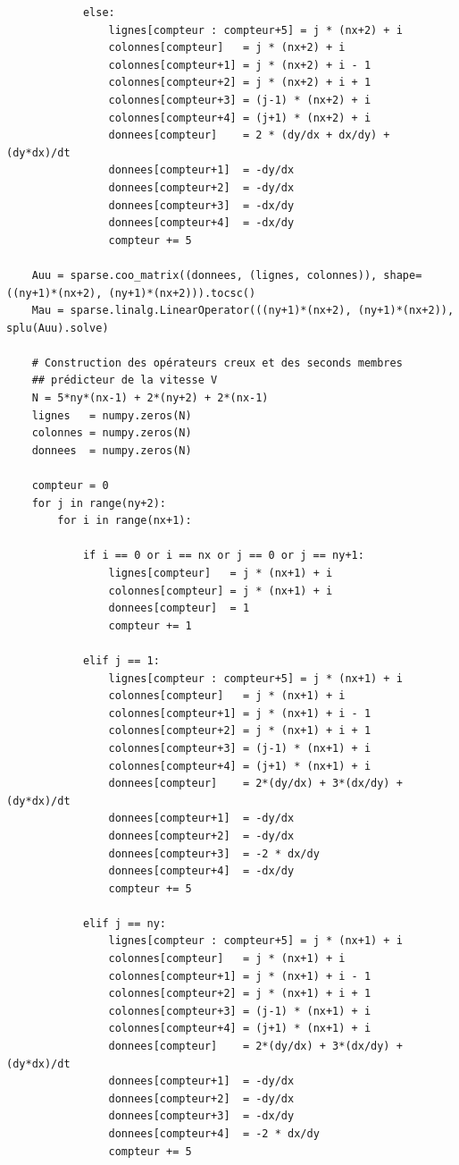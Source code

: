 \begin{verbatim}
            else:
                lignes[compteur : compteur+5] = j * (nx+2) + i
                colonnes[compteur]   = j * (nx+2) + i
                colonnes[compteur+1] = j * (nx+2) + i - 1
                colonnes[compteur+2] = j * (nx+2) + i + 1
                colonnes[compteur+3] = (j-1) * (nx+2) + i
                colonnes[compteur+4] = (j+1) * (nx+2) + i
                donnees[compteur]    = 2 * (dy/dx + dx/dy) + (dy*dx)/dt
                donnees[compteur+1]  = -dy/dx
                donnees[compteur+2]  = -dy/dx
                donnees[compteur+3]  = -dx/dy
                donnees[compteur+4]  = -dx/dy
                compteur += 5

    Auu = sparse.coo_matrix((donnees, (lignes, colonnes)), shape=((ny+1)*(nx+2), (ny+1)*(nx+2))).tocsc()
    Mau = sparse.linalg.LinearOperator(((ny+1)*(nx+2), (ny+1)*(nx+2)), splu(Auu).solve)
    
    # Construction des opérateurs creux et des seconds membres
    ## prédicteur de la vitesse V
    N = 5*ny*(nx-1) + 2*(ny+2) + 2*(nx-1)
    lignes   = numpy.zeros(N)
    colonnes = numpy.zeros(N)
    donnees  = numpy.zeros(N)
    
    compteur = 0
    for j in range(ny+2):
        for i in range(nx+1):
                
            if i == 0 or i == nx or j == 0 or j == ny+1:
                lignes[compteur]   = j * (nx+1) + i
                colonnes[compteur] = j * (nx+1) + i
                donnees[compteur]  = 1
                compteur += 1
   
            elif j == 1:
                lignes[compteur : compteur+5] = j * (nx+1) + i
                colonnes[compteur]   = j * (nx+1) + i
                colonnes[compteur+1] = j * (nx+1) + i - 1
                colonnes[compteur+2] = j * (nx+1) + i + 1
                colonnes[compteur+3] = (j-1) * (nx+1) + i
                colonnes[compteur+4] = (j+1) * (nx+1) + i
                donnees[compteur]    = 2*(dy/dx) + 3*(dx/dy) + (dy*dx)/dt
                donnees[compteur+1]  = -dy/dx
                donnees[compteur+2]  = -dy/dx
                donnees[compteur+3]  = -2 * dx/dy
                donnees[compteur+4]  = -dx/dy
                compteur += 5
            
            elif j == ny:
                lignes[compteur : compteur+5] = j * (nx+1) + i
                colonnes[compteur]   = j * (nx+1) + i
                colonnes[compteur+1] = j * (nx+1) + i - 1
                colonnes[compteur+2] = j * (nx+1) + i + 1
                colonnes[compteur+3] = (j-1) * (nx+1) + i
                colonnes[compteur+4] = (j+1) * (nx+1) + i
                donnees[compteur]    = 2*(dy/dx) + 3*(dx/dy) + (dy*dx)/dt
                donnees[compteur+1]  = -dy/dx
                donnees[compteur+2]  = -dy/dx
                donnees[compteur+3]  = -dx/dy
                donnees[compteur+4]  = -2 * dx/dy
                compteur += 5


\end{verbatim}
